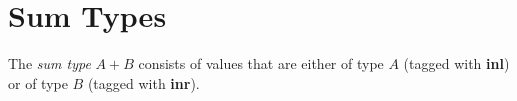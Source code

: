 \section{Sum Types}
The \emph{sum type} $A + B$ consists of values that are either of type $A$ (tagged with \textbf{inl}) or of type $B$ (tagged with \textbf{inr}).